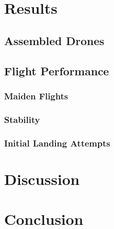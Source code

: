 \documentclass{article}
\begin{document}
\section{Results}

\subsection{Assembled Drones}




\subsection{Flight Performance}
\subsubsection{Maiden Flights}


\subsubsection{Stability}


\subsubsection{Initial Landing Attempts}


\section{Discussion}




\section{Conclusion}




\end{document}
